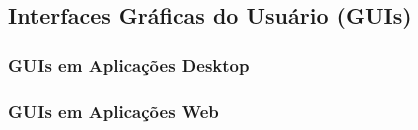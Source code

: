 

\subsection{Interfaces Gráficas do Usuário (GUIs)}
\label{sec:guis}

\subsubsection{GUIs em Aplicações Desktop}
\label{sec:guis-desktop}


\subsubsection{GUIs em Aplicações Web}
\label{sec:guis-web}

%
%


